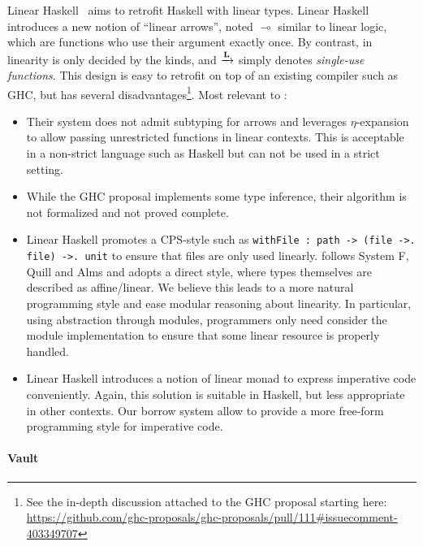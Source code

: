 Linear Haskell~\citep{DBLP:journals/pacmpl/BernardyBNJS18} aims
to retrofit Haskell with linear types.
Linear Haskell introduces a new notion
of ``linear arrows'', noted $\multimap$ similar to linear logic,
which are functions who use their argument exactly once.
By contrast, in \lang linearity is only decided
by the kinds, and ${\xrightarrow{\mathbf{L}}}$ simply denotes \emph{single-use functions}.
This design is easy to retrofit on top of an existing compiler
such as GHC, but has several disadvantages\footnote{
  See the in-depth discussion attached to the GHC proposal starting here: \url{https://github.com/ghc-proposals/ghc-proposals/pull/111\#issuecomment-403349707}}.
Most relevant to \lang:
\begin{itemize}
\item Their system does not admit subtyping for arrows and leverages
  $\eta$-expansion to allow passing unrestricted functions in linear
  contexts. This is acceptable in a non-strict language such as
  Haskell but can not be used in a strict setting.
\item
  While the GHC proposal implements some type inference,
  their algorithm is not formalized and not proved complete.
\item
  Linear Haskell promotes a CPS-style such as 
  \lstinline/withFile : path -> (file ->. file) ->. unit/
  to ensure that files are only used linearly.
  \lang follows System F\degree, Quill and Alms and
  adopts a direct style, where types themselves are
  described as affine/linear.
  We believe this leads to a more natural programming style
  and ease modular reasoning about linearity.
  In particular, using abstraction through modules,
  programmers only need consider the module
  implementation to ensure that some linear
  resource is properly handled.
\item
  Linear Haskell introduces a notion of linear monad to express
  imperative code conveniently. Again, this solution is suitable in Haskell,
  but less appropriate in other contexts. Our borrow system allow
  to provide a more free-form programming style for imperative code.
\end{itemize}

\paragraph{Vault\citep{DBLP:conf/pldi/DeLineF01,DBLP:conf/pldi/FahndrichD02}}

